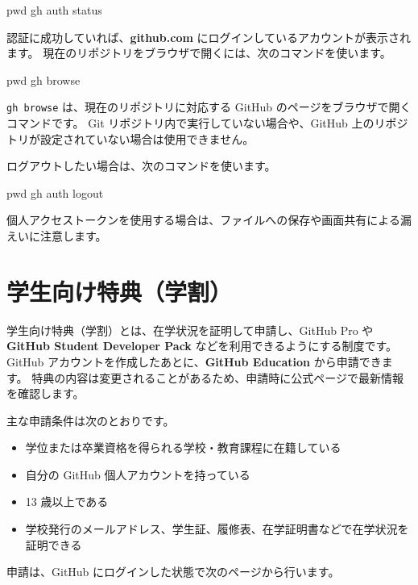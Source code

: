 \documentclass[a4paper]{jlreq}
\newcommand{\cmd}[1]{\texttt{#1}}
\newcommand{\term}[1]{\textbf{#1}}
\begin{document}
\begin{codeblock}
pwd
gh auth status
\end{codeblock}

認証に成功していれば、\term{github.com} にログインしているアカウントが表示されます\cite{gh-auth-status}。
現在のリポジトリをブラウザで開くには、次のコマンドを使います。

\begin{codeblock}
pwd
gh browse
\end{codeblock}

\cmd{gh browse} は、現在のリポジトリに対応する GitHub のページをブラウザで開くコマンドです。
Git リポジトリ内で実行していない場合や、GitHub 上のリポジトリが設定されていない場合は使用できません。

ログアウトしたい場合は、次のコマンドを使います。

\begin{codeblock}
pwd
gh auth logout
\end{codeblock}

個人アクセストークンを使用する場合は、ファイルへの保存や画面共有による漏えいに注意します。

\newpage
\section{学生向け特典（学割）}

学生向け特典（学割）とは、在学状況を証明して申請し、GitHub Pro や \term{GitHub Student Developer Pack} などを利用できるようにする制度です\cite{github-student-pack}。
GitHub アカウントを作成したあとに、\term{GitHub Education} から申請できます\cite{github-education-apply}。
特典の内容は変更されることがあるため、申請時に公式ページで最新情報を確認します。

\begin{samepage}
主な申請条件は次のとおりです\cite{github-education-apply}。

\begin{itemize}
  \item 学位または卒業資格を得られる学校・教育課程に在籍している
  \item 自分の GitHub 個人アカウントを持っている
  \item 13 歳以上である
  \item 学校発行のメールアドレス、学生証、履修表、在学証明書などで在学状況を証明できる
\end{itemize}
\end{samepage}

申請は、GitHub にログインした状態で次のページから行います。
\end{document}
